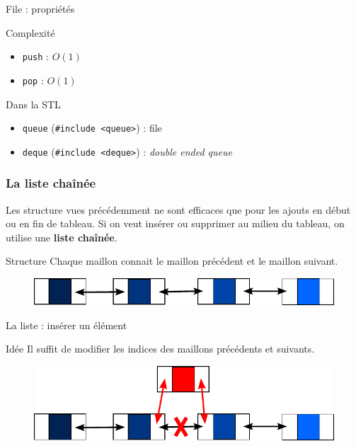 \documentclass{beamer}
\begin{document}
\begin{frame}{File : propriétés}
\begin{block}{Complexité}
\begin{itemize}
  \item \texttt{push} : $O(1)$
  \item \texttt{pop} : $O(1)$
\end{itemize}
\end{block}

\begin{exampleblock}{Dans la STL}
  \begin{itemize}
  \item \texttt{queue} (\texttt{\#include <queue>}) : file
  \item \texttt{deque} (\texttt{\#include <deque>}) : \textit{double ended queue}
  \end{itemize}
\end{exampleblock}

\end{frame}


\begin{frame}
\frametitle{La liste chaînée}
Les structure vues précédemment ne sont efficaces que pour les ajouts en début ou en fin de tableau. Si on veut insérer ou supprimer au milieu du tableau, on utilise une \textbf{liste chaînée}.

\begin{block}{Structure}
Chaque maillon connait le maillon précédent et le maillon suivant.
\end{block}

\begin{figure}
\centering
\includegraphics[width=0.9 \linewidth]{./images/liste01.pdf}
\end{figure}
\end{frame}

\begin{frame}{La liste : insérer un élément}
\begin{block}{Idée}
Il suffit de modifier les indices des maillons précédents et suivants.
\end{block}

\begin{figure}
\centering
\includegraphics[width=0.9 \linewidth]{./images/liste02.pdf}
\end{figure}
\end{frame}
\end{document}
